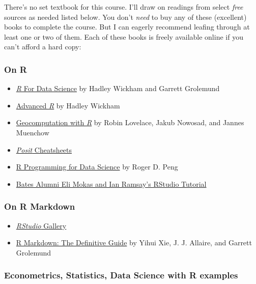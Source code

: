 \documentclass[11pt]{article}
\begin{document}
There's no set textbook for this course. I'll draw on readings from select \textit{free} sources as needed listed below. You don't \textit{need} to buy any of these (excellent) books to complete the course. But I can eagerly recommend leafing through at least one or two of them. Each of these books is freely available online if you can't afford a hard copy:
%
\subsubsection*{On R}

\begin{itemize}
    \item \href{https://r4ds.had.co.nz/}{\emph{R} For Data Science} by Hadley Wickham and Garrett Grolemund
    \item \href{https://adv-r.hadley.nz/}{Advanced \emph{R}} by Hadley Wickham
    \item \href{https://geocompr.robinlovelace.net/}{Geocomputation with \emph{R}} by Robin Lovelace, Jakub Nowosad, and Jannes Muenchow
    \item \href{https://rstudio.com/resources/cheatsheets/}{\emph{Posit} Cheatsheets}
    \item \href{https://bookdown.org/rdpeng/rprogdatascience/}{R Programming for Data Science} by Roger D. Peng
    \item \href{https://www.youtube.com/watch?v=Ih84O1vfH8Y&t=3391s}{Bates Alumni Eli Mokas and Ian Ramsay's RStudio Tutorial}
\end{itemize}

\subsubsection*{On R Markdown}

\begin{itemize}
    \item \href{https://rmarkdown.rstudio.com/gallery.html}{\emph{RStudio} Gallery}
    \item \href{https://bookdown.org/yihui/rmarkdown/}{R Markdown: The Definitive Guide} by Yihui Xie, J. J. Allaire, and Garrett Grolemund
\end{itemize}

\subsubsection*{Econometrics, Statistics, Data Science with R examples}
\end{document}
